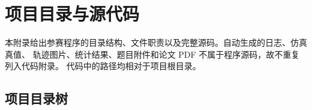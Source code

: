 
\appendix
\section{项目目录与源代码}

本附录给出参赛程序的目录结构、文件职责以及完整源码。自动生成的日志、仿真真值、
轨迹图片、统计结果、题目附件和论文 PDF 不属于程序源码，故不重复列入代码附录。
代码中的路径均相对于项目根目录。

\tableofcontents
\clearpage

\subsection{项目目录树}

